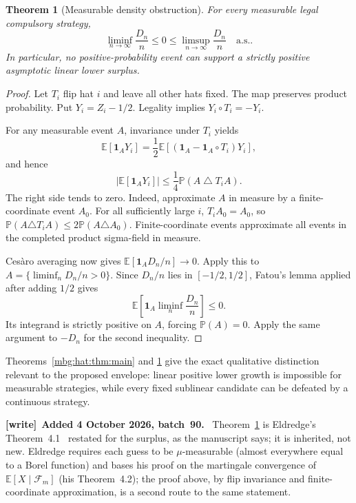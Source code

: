 \documentclass[11pt,letterpaper]{article}
\newtheorem{theorem}{Theorem}[section]
\theoremstyle{definition}
\newcommand{\E}{\mathbb E}
\newcommand{\Prb}{\mathbb P}
\newcommand{\ind}{\mathbf 1}
\newcommand{\as}{\text{a.s.}}
\newenvironment{writenote}[1][]{\par\smallskip\begingroup\small
 \noindent\textbf{[write]}\if\relax\detokenize{#1}\relax\else~\textbf{#1.}\fi\ }%
 {\par\endgroup\smallskip}
\begin{document}
\begin{theorem}[Measurable density obstruction]\label{mbg:hat:thm:linear}
For every measurable legal compulsory strategy,
\[
  \liminf_{n\to\infty}\frac{D_n}{n}\le0
  \le\limsup_{n\to\infty}\frac{D_n}{n}
  \quad\as.                                               \tag{25.1}\label{mbg:hat:eq:linear}
\]
In particular, no positive-probability event can support a strictly
positive asymptotic linear lower surplus.
\end{theorem}
\begin{proof}
Let \(T_i\) flip hat \(i\) and leave all other hats fixed.
The map preserves product probability. Put \(Y_i=Z_i-1/2\).
Legality implies \(Y_i\circ T_i=-Y_i\).

For any measurable event \(A\), invariance under \(T_i\) yields
\[
  \E[\ind_A Y_i]
  =\frac12\E[(\ind_A-\ind_A\circ T_i)Y_i],
\]
and hence
\[
  |\E[\ind_A Y_i]|\le\frac14\Prb(A\mathbin{\triangle}T_iA).
\]
The right side tends to zero. Indeed, approximate \(A\) in measure
by a finite-coordinate event \(A_0\). For all sufficiently large
\(i\), \(T_iA_0=A_0\), so
\(\Prb(A\triangle T_iA)\le2\Prb(A\triangle A_0)\).
Finite-coordinate events approximate all events in the completed
product sigma-field in measure.

Ces\`aro averaging now gives
\(\E[\ind_A D_n/n]\to0\). Apply this to
\(A=\{\liminf_n D_n/n>0\}\). Since \(D_n/n\) lies in
\([-1/2,1/2]\), Fatou's lemma applied after adding \(1/2\)
gives
\[
  \E\!\left[\ind_A\liminf_n\frac{D_n}{n}\right]\le0.
\]
Its integrand is strictly positive on \(A\), forcing \(\Prb(A)=0\).
Apply the same argument to \(-D_n\) for the second inequality.
\end{proof}

Theorems~\ref{mbg:hat:thm:main} and \ref{mbg:hat:thm:linear} give the exact
qualitative distinction relevant to the proposed envelope: linear
positive lower growth is impossible for measurable strategies,
while every fixed sublinear candidate can be defeated by a
continuous strategy.

\begin{writenote}[Added 4 October 2026, batch~90]
Theorem~\ref{mbg:hat:thm:linear} is Eldredge's Theorem~4.1~\cite{hat:Eldredge} restated for the surplus, as the manuscript says; it is inherited, not new. Eldredge requires each guess to be $\mu$-measurable (almost everywhere equal to a Borel function) and bases his proof on the martingale convergence of $\E[X\mid\mathcal F_m]$ (his Theorem~4.2); the proof above, by flip invariance and finite-coordinate approximation, is a second route to the same statement.
\end{writenote}
\end{document}
